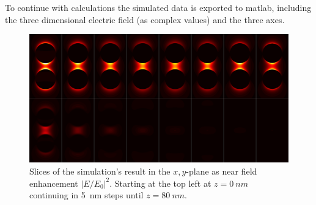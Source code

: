 To continue with calculations the simulated data is exported to matlab, including the three dimensional electric field (as complex values) and the three axes.

\begin{figure}[!h]
  \includegraphics[width=\textwidth]{./images/simulation-slices.png}
  \caption{Slices of the simulation's result in the $x,y$-plane as near field enhancement $|E/E_0|^2$. Starting at the top left at $z=\SI{0}{nm}$ continuing in \SI{5}{nm} steps until $z=\SI{80}{nm}$.}
  \label{fig:slices}
\end{figure}
